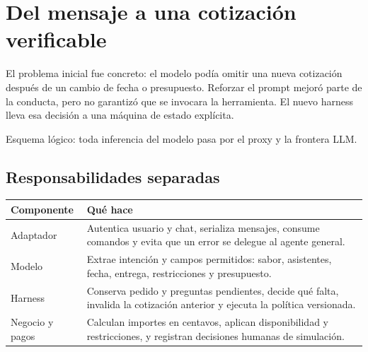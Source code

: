 \documentclass[11pt,a4paper]{article}
\begin{document}
\newpage
\section{Del mensaje a una cotización verificable}
El problema inicial fue concreto: el modelo podía omitir una nueva cotización
después de un cambio de fecha o presupuesto. Reforzar el prompt mejoró parte de la
conducta, pero no garantizó que se invocara la herramienta. El nuevo harness lleva
esa decisión a una máquina de estado explícita.

\begin{center}
\end{center}
{\small\textcolor{muted}{Esquema lógico: toda inferencia del modelo pasa por el proxy y la frontera LLM.}}

\subsection{Responsabilidades separadas}
\begin{tabularx}{\linewidth}{@{}P{32mm}Y@{}}
\toprule
\textbf{Componente} & \textbf{Qué hace}\\
\midrule
Adaptador & Autentica usuario y chat, serializa mensajes, consume comandos y evita que un error se delegue al agente general.\\
Modelo & Extrae intención y campos permitidos: sabor, asistentes, fecha, entrega, restricciones y presupuesto.\\
Harness & Conserva pedido y preguntas pendientes, decide qué falta, invalida la cotización anterior y ejecuta la política versionada.\\
Negocio y pagos & Calculan importes en centavos, aplican disponibilidad y restricciones, y registran decisiones humanas de simulación.\\
\bottomrule
\end{tabularx}
\end{document}
